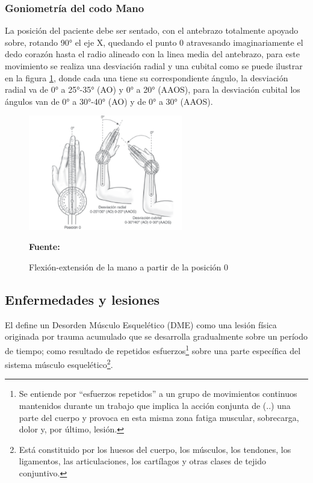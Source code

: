 \subsubsection{Goniometría del codo Mano}
La posición del paciente debe ser sentado, con el antebrazo totalmente apoyado sobre, rotando 90° el eje X, quedando el punto 0 atravesando imaginariamente el dedo corazón hasta el radio alineado con la linea media del antebrazo, para este movimiento se realiza una desviación radial y una cubital como se puede ilustrar en la figura \ref{GONIOMETRIA_MANO}, donde cada una tiene su correspondiente ángulo, la desviación radial va de 0° a 25°-35° (AO)  y 0° a 20° (AAOS), para la desviación cubital los ángulos van de 0° a 30°-40° (AO) y de 0° a 30° (AAOS).\parencite{Taboadela2007TaboadelaLaborales.}

\begin{figure}[H]
    \centering
    \includegraphics[width=0.6\textwidth]{Anexos/LATEX/chapters/images/goniometria_mano.png}
    \caption{Flexión-extensión de la mano a partir de la posición 0}
    \small{\textbf{Fuente:} \parencite{Taboadela2007TaboadelaLaborales.} }
    \label{GONIOMETRIA_MANO}
\end{figure}


\subsection{Enfermedades y lesiones}
El \parencite{MinisteriodeProteccionSocialdeColombia2006GuiaSuperiores} define un Desorden Músculo Esquelético (DME) como una lesión física originada por trauma acumulado que se desarrolla gradualmente sobre un período de tiempo; como resultado de repetidos esfuerzos\footnote{Se entiende por “esfuerzos repetidos” a un grupo de movimientos continuos mantenidos durante un trabajo que implica la acción conjunta de (..) una parte del cuerpo y provoca en esta misma zona fatiga muscular, sobrecarga, dolor y, por último, lesión.\parencite{INSHT2016PrevencionRepetidos}} sobre una parte específica del sistema músculo esquelético\footnote{Está constituido por los huesos del cuerpo, los músculos, los tendones, los ligamentos, las articulaciones, los cartílagos y otras clases de tejido conjuntivo.}. 

